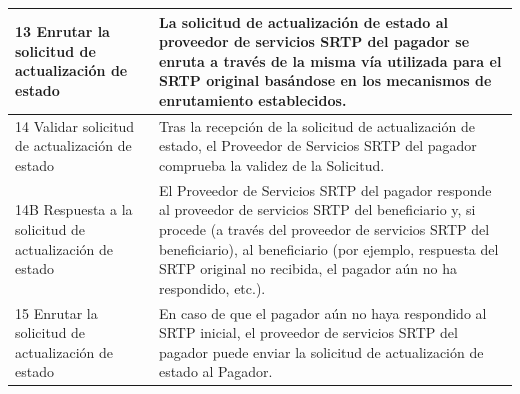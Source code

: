 \begin{longtable}{|p{3cm}|p{12cm}|}
  \hline
  13 Enrutar la solicitud de actualización de estado & La solicitud de actualización de estado al proveedor de servicios SRTP del pagador se enruta a través de la misma vía utilizada para el SRTP original basándose en los mecanismos de enrutamiento establecidos. \\
  \hline
  14 Validar solicitud de actualización de estado & Tras la recepción de la solicitud de actualización de estado, el Proveedor de Servicios SRTP del pagador comprueba la validez de la Solicitud. \\
  \hline
  14B Respuesta a la solicitud de actualización de estado & El Proveedor de Servicios SRTP del pagador responde al proveedor de servicios SRTP del beneficiario y, si procede (a través del proveedor de servicios SRTP del beneficiario), al beneficiario (por ejemplo, respuesta del SRTP original no recibida, el pagador aún no ha respondido, etc.). \\
  \hline
  15 Enrutar la solicitud de actualización de estado & En caso de que el pagador aún no haya respondido al SRTP inicial, el proveedor de servicios SRTP del pagador puede enviar la solicitud de actualización de estado al Pagador. \\
  \hline
\end{longtable}

